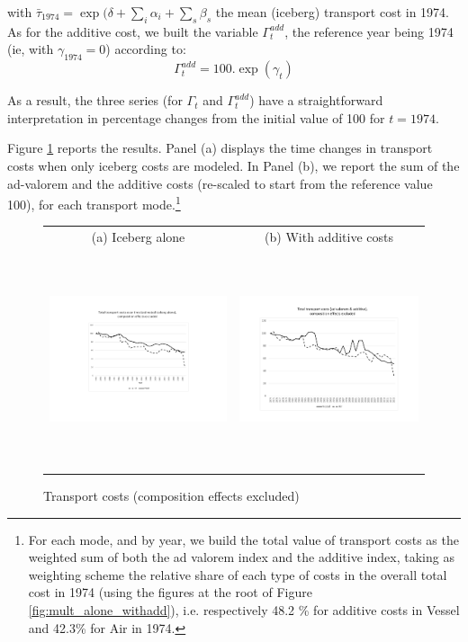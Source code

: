 \documentclass[a4paper,11pt]{article}
\begin{document}
\noindent with $\bar{\tau}_{1974} = \exp(\delta +\sum_i \alpha_i +\sum_s \beta_s$ the mean (iceberg) transport cost in 1974. As for the additive cost, we built the variable $\Gamma^{add}_t$, the reference year being 1974 (ie, with $\gamma_{1974}=0$) according to:
$$\Gamma^{add}_t = 100.\exp(\gamma_t)$$

\noindent As a result, the three series (for $\Gamma_t$ and $\Gamma^{add}_t$) have a straightforward interpretation in percentage changes from the initial value of 100 for $t=1974$.

Figure \ref{fig:totalTC_compeffects_excl} reports the results. Panel (a) displays the time changes in transport costs when only iceberg costs are modeled. In Panel (b), we report the sum of the ad-valorem and the additive costs (re-scaled to start from the reference value 100), for each transport mode.\footnote{For each mode, and by year, we build the total value of transport costs as the weighted sum of both the ad valorem index and the additive index, taking as weighting scheme the relative share of each type of costs in the overall total cost in 1974 (using the figures at the root of Figure \ref{fig:mult_alone_withadd}), i.e. respectively 48.2 \% for additive costs in Vessel and 42.3\% for Air in 1974.}

\begin{figure}[htbp]
\caption{Transport costs (composition effects excluded)}
\label{fig:totalTC_compeffects_excl}
\begin{center}
\begin{tabular}{cc}
{\small (a) Iceberg alone } & {\small (b) With additive costs}\\
\includegraphics[width=3in, height=2.5in]{Fig3a_TC_overtime_comp_effects_excl.pdf}
& \includegraphics[width=3in,height=2.5in]{TC_addplusmult_compeffects_excl.pdf} \\
\end{tabular}
\end{center}
\end{figure}
\end{document}
